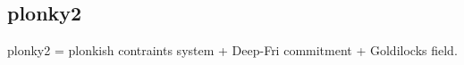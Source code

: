 \subsection{plonky2} \label{sec:plonky2}

plonky2 = plonkish contraints system + Deep-Fri commitment + Goldilocks field. 






